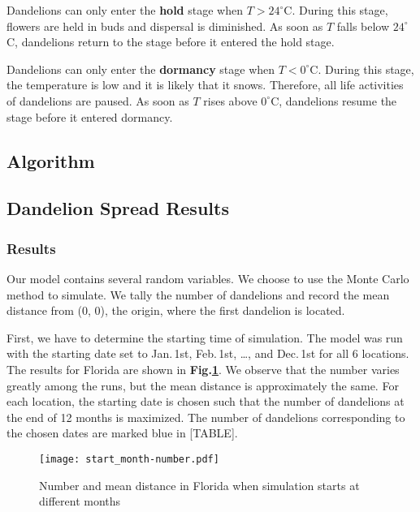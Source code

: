 \documentclass[12pt]{article}
\begin{document}
		Dandelions can only enter the \textbf{hold} stage when $T > 24^\circ$C.  During this stage, flowers are held in buds and dispersal is diminished.  As soon as $T$ falls below $24^\circ$C, dandelions return to the stage before it entered the hold stage.  
		
		Dandelions can only enter the \textbf{dormancy} stage when $T < 0^\circ$C.  During this stage, the temperature is low and it is likely that it snows.  Therefore, all life activities of dandelions are paused.  As soon as $T$ rises above $0^\circ$C, dandelions resume the stage before it entered dormancy.
		
	\subsection{Algorithm}
	
	\subsection{Dandelion Spread Results}
	
		\subsubsection{Results}
		
			Our model contains several random variables.  We choose to use the Monte Carlo method to simulate.  We tally the number of dandelions and record the mean distance from (0, 0), the origin, where the first dandelion is located.
			
			First, we have to determine the starting time of simulation.  The model was run with the starting date set to Jan.\,1st, Feb.\,1st, \ldots, and Dec.\,1st for all 6 locations.  The results for Florida are shown in \textbf{Fig.\ref{fig:start}}.  We observe that the number varies greatly among the runs, but the mean distance is approximately the same.  For each location, the starting date is chosen such that the number of dandelions at the end of 12 months is maximized.  The number of dandelions corresponding to the chosen dates are marked blue in [TABLE].
			
			\begin{figure}
				\centering
				\texttt{[image: start\_month-number.pdf]}
				\caption{Number and mean distance in Florida when simulation starts at different months}
				\label{fig:start}
			\end{figure}
			
\end{document}
